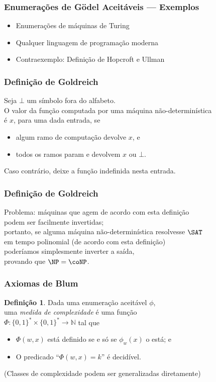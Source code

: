 \documentclass[utf8,notheorems]{beamer}
\theoremstyle{definition}
\newtheorem*{definition}{Definição}
\begin{document}
\begin{frame}
    \frametitle{Enumerações de Gödel Aceitáveis --- Exemplos}
    \begin{itemize}
        \item Enumerações de máquinas de Turing
        \item Qualquer linguagem de programação moderna
        \item Contraexemplo: Definição de Hopcroft e Ullman
    \end{itemize}
\end{frame}

\begin{frame}
    \frametitle{Definição de Goldreich}
    Seja $\bot$ um símbolo fora do alfabeto. \\
    O valor da função computada por uma máquina não-determinística \\
    é $x$, para uma dada entrada, se
    \begin{itemize}
        \item algum ramo de computação devolve $x$, e
        \item todos os ramos param e devolvem $x$ ou $\bot$.
    \end{itemize}
    Caso contrário, deixe a função indefinida nesta entrada.
    \cite[p.~313]{HopcroftUllman1979}
\end{frame}

\begin{frame}
    \frametitle{Definição de Goldreich}
    Problema: máquinas que agem de acordo com esta definição \\
    podem ser facilmente invertidas;\\
    portanto, se alguma máquina não-determinística resolvesse $\SAT$ \\
    em tempo polinomial (de acordo com esta definição) \\
    poderíamos simplesmente inverter a saída, \\
    provando que $\NP = \coNP$.
\end{frame}

\begin{frame}
    \frametitle{Axiomas de Blum}
    \begin{definition}
        Dada uma enumeração aceitável $\phi$, \\
        uma \emph{medida de complexidade} é uma função \\
        $\Phi: \{0, 1\}^* \times \{0, 1\}^* \to \mathbb N$ tal que
        \begin{itemize}
            \item $\Phi(w, x)$ está definido se e só se $\phi_w(x)$ o está; e \\
            \item O predicado ``$\Phi(w, x) = k$'' é decidível.
        \end{itemize}
    \end{definition}
    \cite[p.~324]{Blum1967}

    (Classes de complexidade podem ser generalizadas diretamente)
\end{frame}
\end{document}
